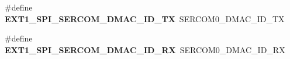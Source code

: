 \begin{DoxyCompactItemize}
\item 
\hypertarget{group__saml21__xplained__pro__features__group_ga8ae9ef7da196c166c214e5ae7fae0f08}{}\#define {\bfseries E\+X\+T1\+\_\+\+S\+P\+I\+\_\+\+S\+E\+R\+C\+O\+M\+\_\+\+D\+M\+A\+C\+\_\+\+I\+D\+\_\+\+T\+X}~S\+E\+R\+C\+O\+M0\+\_\+\+D\+M\+A\+C\+\_\+\+I\+D\+\_\+\+T\+X\label{group__saml21__xplained__pro__features__group_ga8ae9ef7da196c166c214e5ae7fae0f08}

\item 
\hypertarget{group__saml21__xplained__pro__features__group_ga6bb390a4ffd62a13afbca383227b128f}{}\#define {\bfseries E\+X\+T1\+\_\+\+S\+P\+I\+\_\+\+S\+E\+R\+C\+O\+M\+\_\+\+D\+M\+A\+C\+\_\+\+I\+D\+\_\+\+R\+X}~S\+E\+R\+C\+O\+M0\+\_\+\+D\+M\+A\+C\+\_\+\+I\+D\+\_\+\+R\+X\label{group__saml21__xplained__pro__features__group_ga6bb390a4ffd62a13afbca383227b128f}

\end{DoxyCompactItemize}
